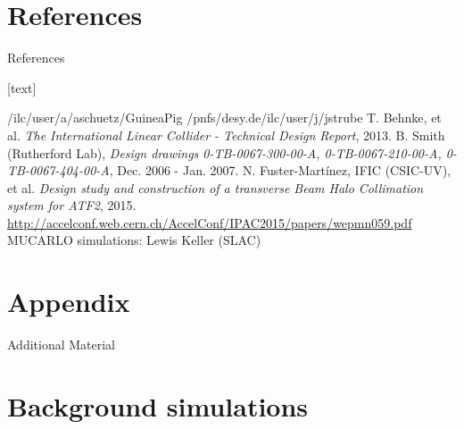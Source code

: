 \documentclass[xcolor={dvipsnames}]{beamer}
\begin{document}
\section*{References}
\begin{frame}{References}
\begin{thebibliography}{9}
[text]

 /ilc/user/a/aschuetz/GuineaPig
 /pnfs/desy.de/ilc/user/j/jstrube
 T. Behnke, et al. \emph{The International Linear Collider - Technical Design Report}, 2013.
 B. Smith (Rutherford Lab), \emph{Design drawings 0-TB-0067-300-00-A, 0-TB-0067-210-00-A, 0-TB-0067-404-00-A}, Dec. 2006 - Jan. 2007.
 N. Fuster-Martínez, IFIC (CSIC-UV), et al. \emph{Design study and construction of a transverse Beam Halo Collimation system for ATF2}, 2015. \url{http://accelconf.web.cern.ch/AccelConf/IPAC2015/papers/wepmn059.pdf}
 MUCARLO simulations: Lewis Keller (SLAC)

\end{thebibliography}
\end{frame}


\section{Appendix}
\appendix

\begin{frame}
\begin{center}
\LARGE Additional Material
\end{center}
  \tableofcontents
\end{frame}

\section{Background simulations}
\end{document}
